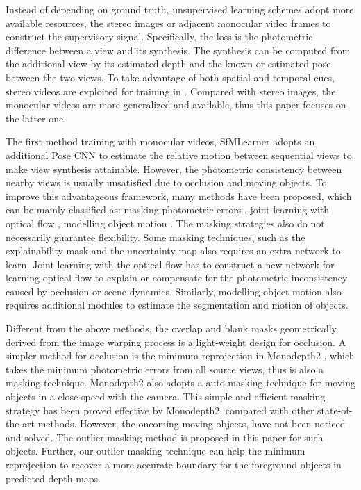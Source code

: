 \documentclass[letterpaper, 10 pt, conference]{ieeeconf}
\begin{document}
Instead of depending on ground truth, unsupervised learning schemes adopt more available resources, the stereo images \cite{garg2016unsupervised, godard2017unsupervised} or adjacent monocular video frames \cite{zhou2017unsupervised} to construct the supervisory signal. Specifically, the loss is the photometric difference between a view and its synthesis. The synthesis can be computed from the additional view by its estimated depth and the known or estimated pose between the two views. To take advantage of both spatial and temporal cues, stereo videos are exploited for training in \cite{zhan2018unsupervised, li2018undeepvo, luo2019every, godard2019digging}. Compared with stereo images, the monocular videos are more generalized and available, thus this paper focuses on the latter one.  

The first method training with monocular videos, SfMLearner \cite{zhou2017unsupervised} adopts an additional Pose CNN to estimate the relative motion between sequential views to make view synthesis attainable. However, the photometric consistency between nearby views is usually unsatisfied due to occlusion and moving objects. 
To improve this advantageous framework, many methods have been proposed, which can be mainly classified as: masking photometric errors \cite{zhou2017unsupervised, godard2019digging, klodt2018supervising, wang2019unsupervised}, joint learning with optical flow \cite{luo2019every, yin2018geonet, zou2018df}, modelling object motion \cite{casser2019struct2depth, vijayanarasimhan2017sfm, Gordon_2019_ICCV}. 
The masking strategies also do not necessarily guarantee flexibility. 
Some masking techniques, such as the explainability mask \cite{zhou2017unsupervised} and the uncertainty map \cite{klodt2018supervising} also requires an extra network to learn. 
Joint learning with the optical flow has to construct a new network for learning optical flow to explain or compensate for the photometric inconsistency caused by occlusion or scene dynamics. 
Similarly, modelling object motion also requires additional modules to estimate the segmentation and motion of objects. 


Different from the above methods, the overlap and blank masks geometrically derived from the image warping process \cite{wang2019unsupervised} is a light-weight design for occlusion. A simpler method for occlusion is the {minimum reprojection} in Monodepth2 \cite{godard2019digging}, which takes the minimum photometric errors from all source views, thus is also a masking technique. Monodepth2 also adopts a {auto-masking} technique for moving objects in a close speed with the camera. This simple and efficient masking strategy has been proved effective by Monodepth2, compared with other state-of-the-art methods. However, the oncoming moving objects, have not been noticed and solved. The outlier masking method is proposed in this paper for such objects. Further, our {outlier masking} technique can help the {minimum reprojection} to recover a more accurate boundary for the foreground objects in predicted depth maps. 
\end{document}
